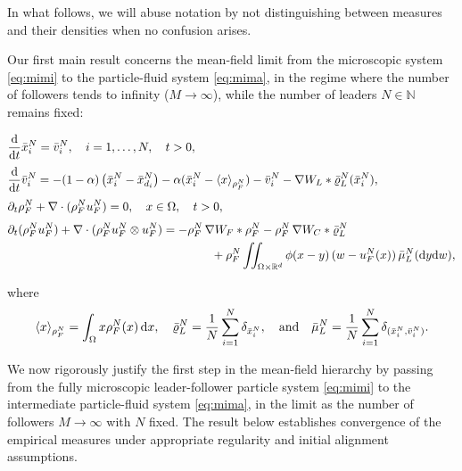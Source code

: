 \documentclass[10pt, reqno]{amsart}
\theoremstyle{definition}
\theoremstyle{remark}
\numberwithin{equation}{section}
\newcommand{\dx}{\textnormal{d}x}
\newcommand{\dy}{\textnormal{d}y}
\newcommand{\dw}{\textnormal{d}w}
\newcommand{\ddt}{\frac{\textnormal{d}}{\textnormal{d}t}}
\newcommand{\R}{\mathbb{R}}
\begin{document}
In what follows, we will abuse notation by not distinguishing between measures and their densities when no confusion arises.

Our first main result concerns the mean-field limit from the microscopic system \eqref{eq:mimi} to the particle-fluid system \eqref{eq:mima}, in the regime where the number of followers tends to infinity ($M \to \infty$), while the number of leaders $N \in \mathbb{N}$ remains fixed:
\begin{mybox}
\begin{equation}\label{eq:mima}
\begin{split}
    &\ddt \bar{x}_i^N = \bar{v}_i^N, \quad i = 1,\dots, N, \quad t > 0,\\[1mm]
    &\ddt \bar{v}_i^N = -(1-\alpha)\left(\bar{x}_i^N - \bar x_{d_i}^N \right) -\alpha (\bar{x}_i^N - \langle x \rangle_{\rho_F^N} ) - \bar{v}_i^N - \nabla W_L *   \bar\varrho_{L}^N(\bar{x}_i^N),\\[1mm]
    &\partial_t \rho_F^N + \nabla \cdot (\rho_F^N u_F^N) = 0, \quad x\in \Omega, \quad t > 0,\\[1mm]
    &\partial_t (\rho_F^N u_F^N) + \nabla \cdot (\rho_F^N u_F^N\otimes u_F^N) = -\rho_F^N\, \nabla W_F * \rho_F^N - \rho_F^N\, \nabla W_C *  \bar\varrho_{L}^N \\
    &\hspace{6cm} + \rho_F^N \iint_{\Omega \times\R^d } \phi(x-y)\,(w - u_F^N(x))\,\bar\mu_L^N(\dy\dw),
\end{split}
\end{equation} 
\end{mybox}
where
\[
\langle x \rangle_{\rho_F^N} = \int_{\Omega} x\rho_F^N(x)\,\dx, \quad \bar\varrho_{L}^N = \frac1N \sum_{i=1}^N \delta_{\bar x_i^N},  \quad \mbox{and}  \quad \bar\mu_L^N = \frac1N \sum_{i=1}^N \delta_{(\bar x_i^N, \bar v_i^N)}.
\]

We now rigorously justify the first step in the mean-field hierarchy by passing from the fully microscopic leader-follower particle system \eqref{eq:mimi} to the intermediate particle-fluid system \eqref{eq:mima}, in the limit as the number of followers $M \to \infty$ with $N$ fixed. The result below establishes convergence of the empirical measures under appropriate regularity and initial alignment assumptions.
\end{document}
